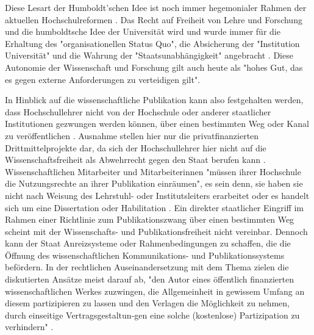 Diese Lesart der Humboldt’schen Idee ist noch immer hegemonialer Rahmen der aktuellen Hochschulreformen \cite{Huber_2005}. Das Recht auf Freiheit von Lehre und Forschung und die humboldtsche Idee der Universität wird und wurde immer für die Erhaltung des "organisationellen Status Quo", die Absicherung der "Institution Universität" und die Wahrung der "Staatsunabhängigkeit" angebracht \cite{Huber_2005}. Diese Autonomie der Wissenschaft und Forschung gilt auch heute als "hohes Gut, das es gegen externe Anforderungen zu verteidigen gilt"\cite{kaldewey_2010}.

In Hinblick auf die wissenschaftliche Publikation kann also festgehalten werden, dass Hochschullehrer nicht von der Hochschule oder anderer staatlicher Institutionen gezwungen werden können, über einen bestimmten Weg oder Kanal zu veröffentlichen \cite{spindler_2006_rechtloa} \cite{dorschel_2006_open}. Ausnahme stellen hier nur die privatfinanzierten Drittmittelprojekte dar, da sich der Hochschullehrer hier nicht auf die Wissenschaftsfreiheit als Abwehrrecht gegen den Staat berufen kann \cite{spindler_2006_rechtloa}. Wissenschaftlichen Mitarbeiter und Mitarbeiterinnen "müssen ihrer Hochschule die Nutzungsrechte an ihrer Publikation einräumen", es sein denn, sie haben sie nicht nach Weisung des Lehrstuhl- oder Institutsleiters erarbeitet oder es handelt sich um eine Dissertation oder Habilitation \cite{spindler_2006_rechtloa}. Ein direkter staatlicher Eingriff im Rahmen einer Richtlinie zum Publikationszwang über einen bestimmten Weg scheint mit der Wissenschafts- und Publikationsfreiheit nicht vereinbar. Dennoch kann der Staat Anreizsysteme oder Rahmenbedingungen zu schaffen, die die Öffnung des wissenschaftlichen Kommunikations- und Publikationssystems befördern. In der rechtlichen Auseinandersetzung mit dem Thema zielen die diskutierten Ansätze meist darauf ab, "den Autor eines öffentlich finanzierten wissenschaftlichen Werkes zuzwingen, die Allgemeinheit in gewissem Umfang an diesem partizipieren zu lassen und den Verlagen die Möglichkeit zu nehmen, durch einseitige Vertragsgestaltun-gen eine solche (kostenlose) Partizipation zu verhindern" \cite{dorschel_2006_open}.

